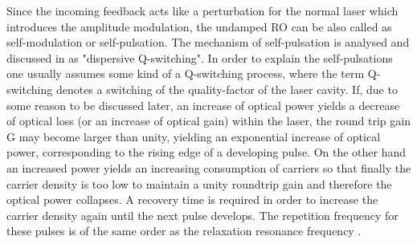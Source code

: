 Since the incoming feedback acts like a perturbation for the normal laser which introduces the amplitude modulation, the undamped RO can be also called as self-modulation or self-pulsation. The mechanism of self-pulsation is analysed and discussed in \cite{bandelow1993theory} as "dispersive Q-switching". In order to explain the self-pulsations one usually assumes some kind of a Q-switching process, where the term Q-switching denotes a switching of the quality-factor of the laser cavity. If, due to some reason to be discussed later, an increase of optical power yields a decrease of optical loss (or an increase of optical gain) within the laser, the round trip gain G may become larger than unity, yielding an exponential increase of optical power, corresponding to the rising edge of a developing pulse. On the other hand an increased power yields an increasing consumption of carriers so that finally the carrier density is too low to maintain a unity roundtrip gain and therefore the optical power collapses. A recovery time is required in order to increase the carrier density again until the next pulse develops. The repetition frequency for these pulses is of the same order as the relaxation resonance frequency \cite{petermann2012laser}.

